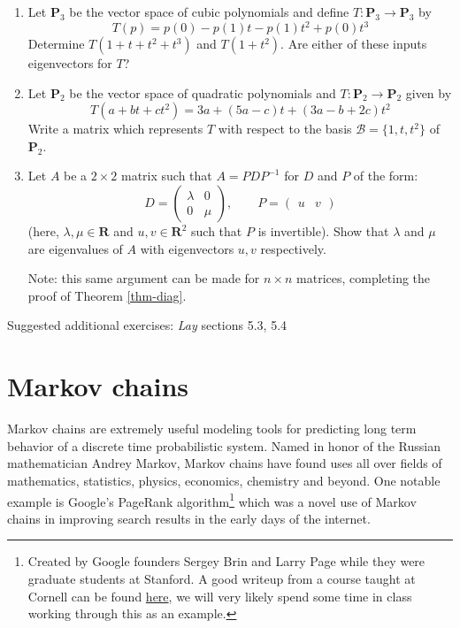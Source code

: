 \documentclass[12pt]{article}
\numberwithin{equation}{subsection}
\numberwithin{figure}{subsection}
\theoremstyle{note}
\newcommand{\R}{\mathbf{R}}
\begin{document}
\begin{enumerate}[label=\arabic*.]
	\item Let $\mathbf{P}_3$ be the vector space of cubic polynomials and define $T\colon \mathbf{P}_3\to \mathbf{P}_3$ by \[ T(p)=p(0)-p(1)t-p(1)t^2+p(0)t^3\]  Determine $T(1+t+t^2+t^3)$ and $T(1+t^2)$. Are either of these inputs eigenvectors for $T$?
	
	\item Let $\mathbf{P}_2$ be the vector space of quadratic polynomials and $T\colon \mathbf{P}_2\to\mathbf{P}_2$ given by \[ T(a+bt+ct^2)=3a+(5a-c)t+(3a-b+2c)t^2\]
	Write a matrix which represents $T$ with respect to the basis $\mathcal{B}=\{1,t,t^2\}$ of $\mathbf{P}_2$. 
	
	\item \label{ex-diag} Let $A$ be a $2\times 2$ matrix such that $A=PDP^{-1}$ for $D$ and $P$ of the form: \[ D=\begin{pmatrix} \lambda & 0 \\ 0 & \mu \end{pmatrix}, \qquad P=\begin{pmatrix} u & v \end{pmatrix}\] (here, $\lambda,\mu\in\R$ and $u,v\in \R^2$ such that  $P$ is invertible). Show that $\lambda$ and $\mu$ are eigenvalues of $A$ with eigenvectors $u,v$ respectively. 
	
	Note: this same argument can be made for $n\times n$ matrices, completing the proof of Theorem \ref{thm-diag}.
\end{enumerate}


Suggested additional exercises: \textit{Lay} sections 5.3, 5.4





\section{Markov chains}

Markov chains are extremely useful modeling tools for predicting long term behavior of a discrete time probabilistic system. Named in honor of the Russian mathematician Andrey Markov, Markov chains have found uses all over fields of mathematics, statistics, physics, economics, chemistry and beyond. One notable example is Google's PageRank algorithm\footnote{Created by Google founders Sergey Brin and Larry Page while they were graduate students at Stanford. A good writeup from a course taught at Cornell can be found \href{https://pi.math.cornell.edu/~mec/Winter2009/RalucaRemus/Lecture3/lecture3.html}{here}, we will very likely spend some time in class working through this as an example.} which was a novel use of Markov chains in improving search results in the early days of the internet. 
\end{document}
